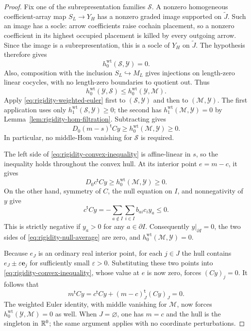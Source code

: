 \begin{proof}
Fix one of the subrepresentation families $\mathcal S$.  A nonzero
homogeneous coefficient-array map $S_L\to Y_H$ has a nonzero graded
image supported on $\widetilde J$.  Such an image has a socle: arrow
coefficients raise cochain placement, so a nonzero coefficient in its
highest occupied placement is killed by every outgoing arrow.  Since
the image is a subrepresentation, this is a socle of $Y_H$ on
$\widetilde J$.  The hypothesis therefore gives
\[
 h_0^{\mathrm{wt}}(\mathcal S,\mathcal Y)=0.
\]
Also, composition with the inclusion $S_L\hookrightarrow M_L$ gives
injections on length-zero linear cocycles, with no length-zero
boundaries to quotient out.  Thus
\[
 h_0^{\mathrm{wt}}(\mathcal Y,\mathcal S)
 \le h_0^{\mathrm{wt}}(\mathcal Y,\mathcal M).
\]
Apply \eqref{eq:rigidity-weighted-euler} first to
$(\mathcal S,\mathcal Y)$ and then to $(\mathcal M,\mathcal Y)$.
The first application uses only
$h_1^{\mathrm{wt}}(\mathcal S,\mathcal Y)\ge0$; the second has
$h_1^{\mathrm{wt}}(\mathcal M,\mathcal Y)=0$ by
Lemma~\ref{lem:rigidity-hom-filtration}.  Subtracting gives
\begin{equation}
 D_0(m-s)^{\mathsf t}Cy
 \ge h_0^{\mathrm{wt}}(\mathcal M,\mathcal Y)\ge0.
 \label{eq:rigidity-convex-inequality}
\end{equation}
In particular, no middle-Hom vanishing for $\mathcal S$ is required.

The left side of \eqref{eq:rigidity-convex-inequality} is affine-linear
in $s$, so the inequality holds throughout the convex hull.  At its
interior point $e=m-c$, it gives
\begin{equation}
 D_0c^{\mathsf t}Cy
 \ge h_0^{\mathrm{wt}}(\mathcal M,\mathcal Y)\ge0.
 \label{eq:rigidity-null-average}
\end{equation}
On the other hand, symmetry of $C$, the null equation on $I$, and
nonnegativity of $y$ give
\begin{equation}
 c^{\mathsf t}Cy
  =-\sum_{a\notin I}\sum_{i\in I}b_{ai}c_i y_a\le0.
 \label{eq:rigidity-boundary-sign}
\end{equation}
This is strictly negative if $y_a>0$ for any $a\in\partial I$.
Consequently $y|_{\partial I}=0$, the two sides of
\eqref{eq:rigidity-null-average} are zero, and
$h_0^{\mathrm{wt}}(\mathcal M,\mathcal Y)=0$.

Because $e_J$ is an ordinary real interior point, for each $j\in J$ the
hull contains $e_J\pm\varepsilon\mathbf e_j$ for sufficiently small
$\varepsilon>0$.  Substituting these two points into
\eqref{eq:rigidity-convex-inequality}, whose value at $e$ is now zero,
forces $(Cy)_j=0$.  It follows that
\[
 m^{\mathsf t}Cy
   =c^{\mathsf t}Cy+(m-c)_J^{\mathsf t}(Cy)_J=0.
\]
The weighted Euler identity, with middle vanishing for $\mathcal M$,
now forces $h_0^{\mathrm{wt}}(\mathcal Y,\mathcal M)=0$ as well.
When $J=\varnothing$, one has $m=c$ and the hull is the singleton in
$\mathbb R^0$; the same argument applies with no coordinate perturbations.
\end{proof}


